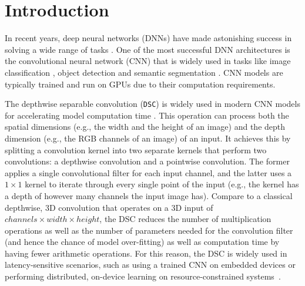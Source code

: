 \section{Introduction}

In recent years, deep neural networks (DNNs) have made astonishing success in solving a wide range of tasks \FIXME{\cite{}}. One of the
most successful DNN architectures is the convolutional neural network (CNN) that is widely used in tasks like image classification
\FIXME{\cite{}}, object detection \FIXME{\cite{}} and  semantic segmentation \FIXME{\cite{}}. CNN models are typically trained and run on
GPUs due to their computation requirements.


The depthwise separable convolution (\texttt{DSC}) is widely used in modern CNN models for accelerating model computation time
\FIXME{\cite{}}. This operation can process both the spatial dimensions (e.g., the width and the height of an image) and the depth
dimension (e.g., the RGB channels of an image) of an input. It achieves this by splitting a convolution kernel into two separate kernels
that perform two convolutions: a depthwise convolution and a pointwise convolution. The former applies a single convolutional filter for
each input channel, and the latter uses a $1 \times 1$ kernel to iterate through every single point of the input (e.g., the kernel has a
depth of however many channels the input image has). Compare to a classical depthwise, 3D convolution that operates on a 3D input of
$channels \times width \times height$, the DSC reduces the number of multiplication operations as well as the number of parameters needed
for the convolution filter (and hence the chance of model over-fitting) as well as computation time by having fewer arithmetic operations.
For this reason, the DSC is widely used in latency-sensitive scenarios, such as using a trained CNN on embedded devices or performing
distributed, on-device learning on resource-constrained systems~\cite{espeholt2019seed}.


